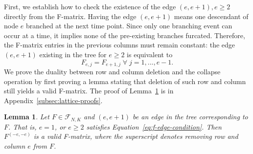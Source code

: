 \documentclass{article}
\newtheorem{lemma}[theorem]{Lemma}
\begin{document}

First, we establish how to check the existence of the edge $(e,e+1), e\geq 2$ directly from the F-matrix. Having the edge $(e,e+1)$ means one descendant of node $e$ branched at the next time point. Since only one branching event can occur at a time, it implies none of the pre-existing branches furcated. Therefore, the F-matrix entries in the previous columns must remain constant: the edge $(e,e+1)$ existing in the tree for $e\geq 2$ is equivalent to 
\begin{equation}\label{eq:f-edge-condition}
    F_{e,j} = F_{e+1,j} \; \forall \; j=1,..., e-1.
\end{equation}
We prove the duality between row and column deletion and the collapse operation by first proving a lemma stating that deletion of such row and column still yields a valid F-matrix. The proof of Lemma~\ref{lemma:fmat_remove} is in Appendix~\ref{subsec:lattice-proofs}.

\begin{lemma} \label{lemma:fmat_remove}
Let $F \in \mathcal{F}_{N,K}$ and $(e,e+1)$ be an edge in the tree corresponding to $F$. That is, $e=1$, or $e\geq 2$ satisfies Equation~\ref{eq:f-edge-condition}. Then $F^{(-e,-e)}$ is a valid F-matrix, where the superscript denotes removing row and column $e$ from $F$. 
\end{lemma}
\end{document}
